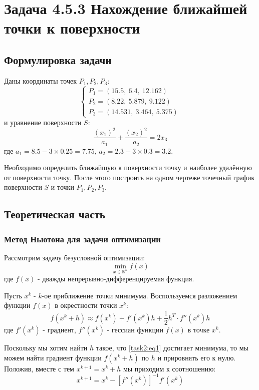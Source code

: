 \documentclass[12pt]{article}%
\begin{document}
\newpage
\section{Задача 4.5.3 Нахождение ближайшей точки к поверхности}
\subsection{Формулировка задачи}
Даны координаты точек $P_1, P_2, P_3$:
\begin{equation*}
    \begin{cases}
        P_1 = (15.5,\ 6.4,\ 12.162) \\
        P_2 = (8.22,\ 5.879,\ 9.122) \\
        P_3 = (14.531,\ 3.464,\ 5.375) 
    \end{cases}
\end{equation*}
и уравнение поверхности $S$:
\begin{equation*}
    \frac{(x_1)^2}{a_1} + \frac{(x_2)^2}{a_2} = 2x_3
\end{equation*}
где $a_1 = 8.5 - 3\times0.25 = 7.75$, $a_2 = 2.3 + 3\times0.3 = 3.2$.

Необходимо определить ближайшую к поверхности точку и наиболее удалённую от поверхности точку. После этого построить на одном чертеже точечный график поверхности $S$ и точки $P_1, P_2, P_3$.

\subsection{Теоретическая часть}
\subsubsection{Метод Ньютона для задачи оптимизации}
Рассмотрим задачу безусловной оптимизации:
\begin{equation*}
    \min\limits_{x \in \mathbb{R}^n}f(x)
\end{equation*}
где $f(x)$ - дважды непрерывно-дифференцируемая функция.

Пусть $x^k$ - $k$-ое приближение точки минимума. Воспользуемся разложением функции $f(x)$ в окрестности точки $x^k$:
\begin{equation}\label{task2:eq1}
    f(x^k + h) \approx f(x^k) + f'(x^k)h + \frac{1}{2}h^T \cdot f''(x^k) h
\end{equation}
где $f'(x^k)$ - градиент, $f''(x^k)$ - гессиан функции $f(x)$ в точке $x^k$.

Поскольку мы хотим найти $h$ такое, что \ref{task2:eq1} достигает минимума, то мы можем найти градиент функции $f(x^k + h)$ по $h$ и прировнять его к нулю. Положив, вместе с тем $x^{k+1} = x^k + h$ мы приходим к соотношению:
\begin{equation}
    x^{k+1} = x^k - \left[f''(x^k) \right]^{-1} f'(x^k)
\end{equation}
\end{document}
